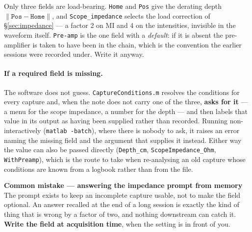 \documentclass[11pt,a4paper]{article}
\newcommand{\good}[1]{\textcolor{green!45!black}{\textbf{#1}}}
\newcommand{\mistaketitle}[1]{\textcolor{orange!75!black}{\textbf{Common mistake --- #1}}\\[2pt]}
\begin{document}
\noindent
Only three fields are load-bearing. \texttt{Home} and \texttt{Pos} give the derating depth
$\lVert\mathtt{Pos}-\mathtt{Home}\rVert$, and \texttt{Scope\_impedance} selects the load correction
of \S\ref{sec:impedance} --- a factor 2 on MI and 4 on the intensities, invisible in the waveform
itself. \texttt{Pre-amp} is the one field with a \emph{default}: if it is absent the pre-amplifier
is taken to have been in the chain, which is the convention the earlier sessions were recorded
under. Write it anyway.

\paragraph{If a required field is missing.} The software does not guess.
\texttt{CaptureConditions.m} resolves the conditions for every capture and, when the note does not
carry one of the three, \textbf{asks for it} --- a menu for the scope impedance, a number for the
depth --- and then labels that value in its output as having been supplied rather than recorded.
Running non-interactively (\texttt{matlab -batch}), where there is nobody to ask, it raises an error
naming the missing field and the argument that supplies it instead. Either way the value can also be
passed directly (\texttt{Depth\_cm}, \texttt{ScopeImpedance\_Ohm}, \texttt{WithPreamp}), which is
the route to take when re-analysing an old capture whose conditions are known from a logbook rather
than from the file.

\begin{mistake}
\mistaketitle{answering the impedance prompt from memory}
The prompt exists to keep an incomplete capture usable, not to make the field optional. An answer
recalled at the end of a long session is exactly the kind of thing that is wrong by a factor of
two, and nothing downstream can catch it. \good{Write the field at acquisition time}, when the
setting is in front of you.
\end{mistake}
\end{document}
